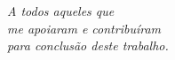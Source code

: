 \begin{dedicatoria}
   \vspace*{\fill}
   \centering
   \noindent
	 \textit{A todos aqueles que \\ 
           me apoiaram e contribuíram \\ 
   para conclusão deste trabalho.} \vspace*{\fill}
\end{dedicatoria}

